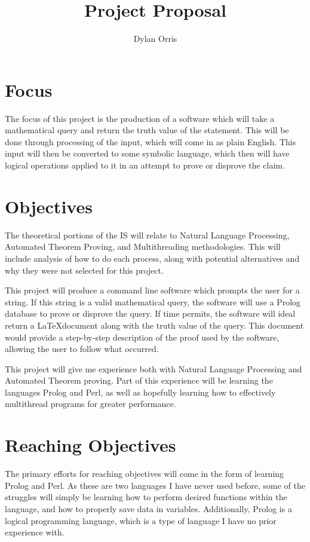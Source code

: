 \documentclass{article}
\begin{document}
\title{Project Proposal}
\author{Dylan Orris}

\maketitle


\section{Focus}
The focus of this project is the production of a software which will take a mathematical query and return the truth value of the statement. This will be done through processing of the input, which will come in as plain English. This input will then be converted to some symbolic language, which then will have logical operations applied to it in an attempt to prove or disprove the claim.

\section{Objectives}
The theoretical portions of the IS will relate to Natural Language Processing, Automated Theorem Proving, and Multithreading methodologies. This will include analysis of how to do each process, along with potential alternatives and why they were not selected for this project.

This project will produce a command line software which prompts the user for a string. If this string is a valid mathematical query, the software will use a Prolog database to prove or disprove the query. If time permits, the software will ideal return a \LaTeX  document along with the truth value of the query. This document would provide a step-by-step description of the proof used by the software, allowing the user to follow what occurred.

This project will give me experience both with Natural Language Processing and Automated Theorem proving. Part of this experience will be learning the languages Prolog and Perl, as well as hopefully learning how to effectively multithread programs for greater performance.
\section{Reaching Objectives}
The primary efforts for reaching objectives will come in the form of learning Prolog and Perl. As these are two languages I have never used before, some of the struggles will simply be learning how to perform desired functions within the language, and how to properly save data in variables. Additionally, Prolog is a logical programming language, which is a type of language I have no prior experience with. 
\end{document}
